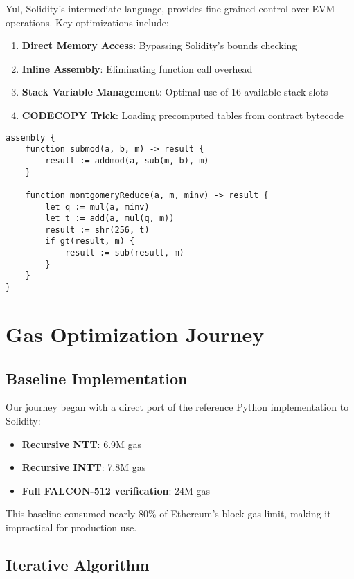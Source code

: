 \documentclass[11pt,a4paper]{article}
\begin{document}
Yul, Solidity's intermediate language, provides fine-grained control over EVM operations. Key optimizations include:

\begin{enumerate}
\item \textbf{Direct Memory Access}: Bypassing Solidity's bounds checking
\item \textbf{Inline Assembly}: Eliminating function call overhead
\item \textbf{Stack Variable Management}: Optimal use of 16 available stack slots
\item \textbf{CODECOPY Trick}: Loading precomputed tables from contract bytecode
\end{enumerate}

\begin{lstlisting}[caption={Yul-Optimized Modular Arithmetic}]
assembly {
    function submod(a, b, m) -> result {
        result := addmod(a, sub(m, b), m)
    }

    function montgomeryReduce(a, m, minv) -> result {
        let q := mul(a, minv)
        let t := add(a, mul(q, m))
        result := shr(256, t)
        if gt(result, m) {
            result := sub(result, m)
        }
    }
}
\end{lstlisting}

\section{Gas Optimization Journey}

\subsection{Baseline Implementation}

Our journey began with a direct port of the reference Python implementation to Solidity:

\begin{itemize}
\item \textbf{Recursive NTT}: 6.9M gas
\item \textbf{Recursive INTT}: 7.8M gas
\item \textbf{Full FALCON-512 verification}: 24M gas
\end{itemize}

This baseline consumed nearly 80\% of Ethereum's block gas limit, making it impractical for production use.

\subsection{Iterative Algorithm}
\end{document}
